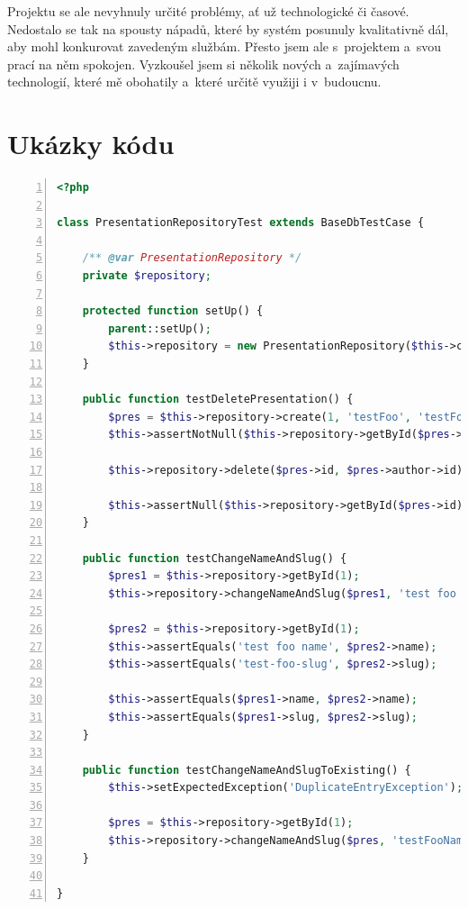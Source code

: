 \documentclass[11pt,twoside,a4paper]{book}
\begin{document}
Projektu se ale nevyhnuly určité problémy, ať už technologické či časové. Nedostalo se tak na spousty nápadů, které by systém posunuly kvalitativně dál, aby mohl konkurovat zavedeným službám. Přesto jsem ale s~projektem a~svou prací na něm spokojen. Vyzkoušel jsem si několik nových a~zajímavých technologií, které mě obohatily a~které určitě využiji i v~budoucnu.





{
\def\CS{$\cal C\kern-0.1667em\lower.5ex\hbox{$\cal S$}\kern-0.075em $}

}




\appendix	

\printnomenclature

\chapter{Ukázky kódu}\label{chap:ukazkykodu}


\begin{lstlisting}[caption={Ukázka integračních testů},label={lst:integrationtest},
language=php,
numbers=left,
breaklines=true]
<?php

class PresentationRepositoryTest extends BaseDbTestCase {

	/** @var PresentationRepository */
	private $repository;

	protected function setUp() {
		parent::setUp();
		$this->repository = new PresentationRepository($this->container->database);
	}

	public function testDeletePresentation() {
		$pres = $this->repository->create(1, 'testFoo', 'testFoo');
		$this->assertNotNull($this->repository->getById($pres->id));

		$this->repository->delete($pres->id, $pres->author->id);

		$this->assertNull($this->repository->getById($pres->id));
	}

	public function testChangeNameAndSlug() {
		$pres1 = $this->repository->getById(1);
		$this->repository->changeNameAndSlug($pres1, 'test foo name', 'test foo slug');

		$pres2 = $this->repository->getById(1);
		$this->assertEquals('test foo name', $pres2->name);
		$this->assertEquals('test-foo-slug', $pres2->slug);

		$this->assertEquals($pres1->name, $pres2->name);
		$this->assertEquals($pres1->slug, $pres2->slug);
	}

	public function testChangeNameAndSlugToExisting() {
		$this->setExpectedException('DuplicateEntryException');

		$pres = $this->repository->getById(1);
		$this->repository->changeNameAndSlug($pres, 'testFooName', 'test2');
	}

}
\end{lstlisting}
\end{document}

